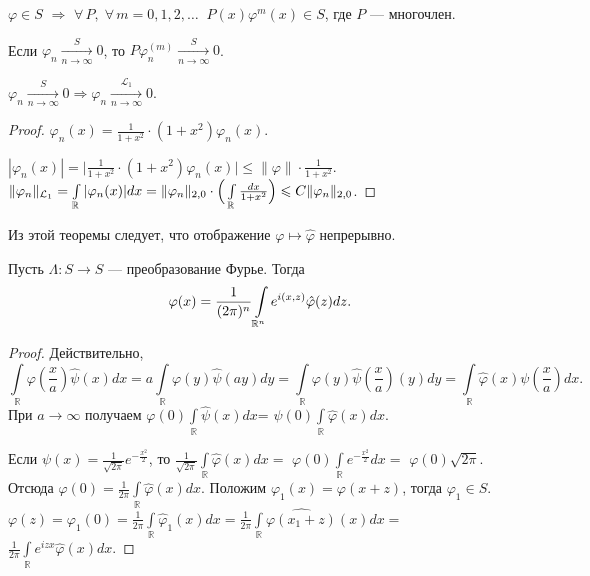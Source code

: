 \documentclass[10pt]{article}
\newcommand*{\p}[1]{#1\nobreak\discretionary{}{\hbox{$\mathsurround=0pt #1$}}{}}
\begin{document}
\begin{theorem}
$\varphi\in S$ $\Rightarrow$ $\forall\, P,\; \forall\,
m=0,1,2,\ldots\;\; P(x)\varphi^m(x)\in S$, где $P$ --- многочлен.
\end{theorem}

\begin{theorem}
Если $\varphi_n \xrightarrow[n\rightarrow \infty]{S} 0$, то
$P\varphi_{n}^{(m)} \xrightarrow[n\rightarrow \infty]{S} 0$.
\end{theorem}

\begin{theorem}
$\varphi_n \xrightarrow[n\rightarrow \infty]{S} 0 \Rightarrow
\varphi_n \xrightarrow[n\rightarrow \infty]{\mathcal{L}_1} 0$.
\end{theorem}

\begin{proof}
$\varphi_n(x)=\frac{1}{1+x^2}\cdot (1+x^2)\varphi_n(x)$.

$|\varphi_n(x)|=\Big|\frac{1}{1+x^2}\cdot
(1+x^2)\varphi_n(x)\Big|\leqslant \|\varphi\|\cdot \frac{1}{1+x^2}$.
$\|\varphi_n\|_{\mathcal{L}_1}=\int\limits_\mathbb{R}|\varphi_n(x)|dx\p=\|\varphi_n\|_{2,0}\cdot
\Big(\int\limits_\mathbb{R}\frac{dx}{1+x^2}\Big)\leqslant
C\|\varphi_n\|_{2,0}$.
\end{proof}

\begin{note}
Из этой теоремы следует, что отображение $\varphi \mapsto \hat
\varphi$ непрерывно.
\end{note}

\begin{theorem} Пусть $\Lambda \colon S \rightarrow S$ --- преобразование Фурье.
Тогда $$\varphi
(x)\p=\frac{1}{(2\pi)^n}\int\limits_{\mathbb{R}^n}e^{i(x,z)}\hat
\varphi(z)dz.$$
\end{theorem}

\begin{proof}
Действительно,
$$\int\limits_\mathbb{R}\varphi(\frac{x}{a})\hat\psi(x)dx=
a\int\limits_\mathbb{R}\varphi(y)\hat\psi(ay)dy=
\int\limits_\mathbb{R}\varphi(y)\hat\psi(\frac{x}{a})(y)dy=
\int\limits_\mathbb{R}\hat\varphi(x)\psi(\frac{x}{a})dx.$$ При
$a\rightarrow \infty$ получаем
$\varphi(0)\int\limits_\mathbb{R}\hat\psi(x)dx$=
$\psi(0)\int\limits_\mathbb{R}\hat\varphi(x)dx$.

Если $\psi (x)=\frac{1}{\sqrt{2\pi}}e^{-\frac{x^2}{2}}$, то
$\frac{1}{\sqrt{2\pi}}\int\limits_{\mathbb{R}}\hat\varphi (x)dx=$
$\varphi (0)\int\limits_{\mathbb{R}}e^{-\frac{x^2}{2}}dx=$ $\varphi
(0)\sqrt{2\pi}$. Отсюда $\varphi
(0)=\frac{1}{2\pi}\int\limits_{\mathbb{R}}\hat\varphi (x)dx$.
Положим $\varphi_1(x)=\varphi (x+z)$, тогда $\varphi_1\in S$.
$\varphi
(z)=\varphi_1(0)=\frac{1}{2\pi}\int\limits_{\mathbb{R}}\hat\varphi_1
(x)dx=$$\frac{1}{2\pi}\int\limits_{\mathbb{R}}\widehat{\varphi
(x_1+z)}(x)dx=$
$\frac{1}{2\pi}\int\limits_{\mathbb{R}}e^{izx}\hat\varphi (x)dx$.
\end{proof}
\end{document}
